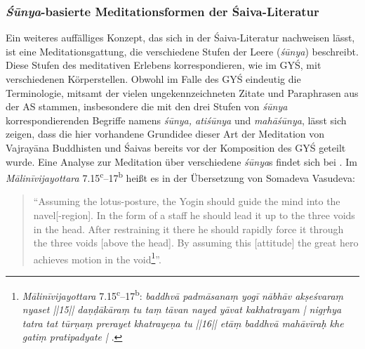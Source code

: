 \documentclass[a4paper,12pt]{article}
\begin{document}
\subsubsection{\textit{Śūnya}-basierte Meditationsformen der Śaiva-Literatur}
\label{medi}

      Ein weiteres auffälliges Konzept, das sich in der Śaiva-Literatur nachweisen lässt, ist eine Meditationsgattung, die verschiedene Stufen der Leere (\textit{śūnya}) beschreibt. Diese Stufen des meditativen Erlebens korrespondieren, wie im GYŚ, mit verschiedenen Körperstellen. Obwohl im Falle des GYŚ eindeutig die Terminologie, mitsamt der vielen ungekennzeichneten Zitate und Paraphrasen aus der AS stammen, insbesondere die mit den drei Stufen von \textit{śūnya} korrespondierenden Begriffe namens \textit{śūnya, atiśūnya} und \textit{mahāśūnya}, lässt sich zeigen, dass die hier vorhandene Grundidee dieser Art der Meditation von Vajrayāna Buddhisten und Śaivas bereits vor der Komposition des GYŚ geteilt wurde. Eine Analyse zur Meditation über verschiedene \textit{śūnya}s findet sich bei \parencite{vasudeva2004}. Im \textit{Mālinīvijayottara} 7.15\textsuperscript{c}–17\textsuperscript{b} heißt es in der Übersetzung von Somadeva Vasudeva: \begin{quote} ``Assuming the lotus-posture, the Yogin should guide the mind into the navel[-region]. In the form of a staff he should lead it up to the three voids in the head. After restraining it there he should rapidly force it through the three voids [above the head]. By assuming this [attitude] the great hero achieves motion in the void\footnote{\textit{Mālinīvijayottara} 7.15\textsuperscript{c}–17\textsuperscript{b}: \textit{baddhvā padmāsanaṃ yogī nābhāv akṣeśvaraṃ nyaset ||15|| daṇḍākāraṃ tu taṃ tāvan nayed yāvat kakhatrayam | nigṛhya tatra tat tūrṇaṃ prerayet khatrayeṇa tu ||16|| etāṃ baddhvā mahāvīraḥ khe gatiṃ pratipadyate |} \parencite[61]{vasudeva2004}.}''. \parencite[266]{vasudeva2004} \end{quote}
\end{document}
